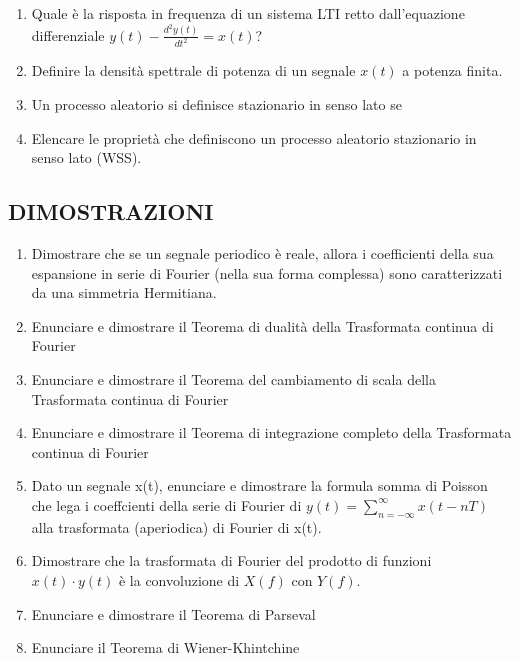 \documentclass[
]{article}
\begin{document}
\begin{enumerate}
\item
Quale è la risposta in frequenza di un sistema LTI retto
dall'equazione differenziale $y(t) - \frac{d^{2}y(t)}{dt^2} = x(t)$?
\item
Definire la densità spettrale di potenza di un segnale \(x(t)\) a
potenza finita.
\item
Un processo aleatorio si definisce stazionario in senso lato se
\item
Elencare le proprietà che definiscono un processo aleatorio
stazionario in senso lato (WSS).
  
\end{enumerate}

\hypertarget{dimostrazioni}{%
\subsection{DIMOSTRAZIONI}\label{dimostrazioni}}

\begin{enumerate}
\def\labelenumi{\arabic{enumi}.}

\item
Dimostrare che se un segnale periodico è reale, allora i coefficienti
della sua espansione in serie di Fourier (nella sua forma complessa)
sono caratterizzati da una simmetria Hermitiana.
\item
  Enunciare e dimostrare il Teorema di dualità della Trasformata
  continua di Fourier
\item
  Enunciare e dimostrare il Teorema del cambiamento di scala della
  Trasformata continua di Fourier
\item
  Enunciare e dimostrare il Teorema di integrazione completo della
  Trasformata continua di Fourier


\item
  Dato un segnale x(t), enunciare e dimostrare la formula somma di
  Poisson che lega i coeffcienti della serie di Fourier di \(\displaystyle y(t) = \sum_{n = -\infty}^{\infty} x(t - nT)\)
  alla trasformata (aperiodica) di Fourier di x(t).
\item
  Dimostrare che la trasformata di Fourier del prodotto di funzioni
  \(x(t) \cdot y(t)\) è la convoluzione di \(X(f)\) con \(Y (f)\).

\item
Enunciare e dimostrare il Teorema di Parseval
\item
  Enunciare il Teorema di Wiener-Khintchine
\end{enumerate}

\newpage
\end{document}
